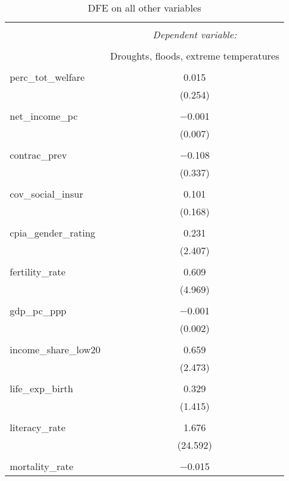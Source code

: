 
\begin{table}[!htbp] \centering 
  \caption{DFE on all other variables} 
  \label{} 
\begin{tabular}{@{\extracolsep{5pt}}lc} 
\\[-1.8ex]\hline 
\hline \\[-1.8ex] 
 & \multicolumn{1}{c}{\textit{Dependent variable:}} \\ 
\cline{2-2} 
\\[-1.8ex] & Droughts, floods, extreme temperatures \\ 
\hline \\[-1.8ex] 
 perc\_tot\_welfare & 0.015 \\ 
  & (0.254) \\ 
  & \\ 
 net\_income\_pc & $-$0.001 \\ 
  & (0.007) \\ 
  & \\ 
 contrac\_prev & $-$0.108 \\ 
  & (0.337) \\ 
  & \\ 
 cov\_social\_insur & 0.101 \\ 
  & (0.168) \\ 
  & \\ 
 cpia\_gender\_rating & 0.231 \\ 
  & (2.407) \\ 
  & \\ 
 fertility\_rate & 0.609 \\ 
  & (4.969) \\ 
  & \\ 
 gdp\_pc\_ppp & $-$0.001 \\ 
  & (0.002) \\ 
  & \\ 
 income\_share\_low20 & 0.659 \\ 
  & (2.473) \\ 
  & \\ 
 life\_exp\_birth & 0.329 \\ 
  & (1.415) \\ 
  & \\ 
 literacy\_rate & 1.676 \\ 
  & (24.592) \\ 
  & \\ 
 mortality\_rate & $-$0.015 \\ 

\end{tabular}
\end{table}
